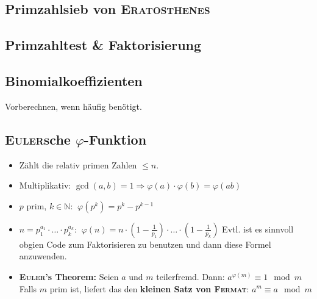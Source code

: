 \subsection{Primzahlsieb von \textsc{Eratosthenes}}


\subsection{Primzahltest \& Faktorisierung}


\subsection{Binomialkoeffizienten}
Vorberechnen, wenn häufig benötigt.


\subsection{\textsc{Euler}sche $\varphi$-Funktion}
\begin{itemize}[nosep]
	\item Zählt die relativ primen Zahlen $\leq n$.

	\item Multiplikativ:
	$\gcd(a,b) = 1 \Longrightarrow \varphi(a) \cdot \varphi(b) = \varphi(ab)$

	\item $p$ prim, $k \in \mathbb{N}$:
	$~\varphi(p^k) = p^k - p^{k - 1}$

	\item $n = p_1^{a_1} \cdot \ldots \cdot p_k^{a_k}$:
	$~\varphi(n) = n \cdot \left(1 - \frac{1}{p_1}\right) \cdot \ldots \cdot \left(1 - \frac{1}{p_k}\right)$
	Evtl. ist es sinnvoll obgien Code zum Faktorisieren zu benutzen und dann diese Formel anzuwenden.

	\item \textbf{\textsc{Euler}'s Theorem:}
	Seien $a$ und $m$ teilerfremd. Dann:
	$a^{\varphi(m)} \equiv 1 \mod m$\newline
	Falls $m$ prim ist, liefert das den \textbf{kleinen Satz von \textsc{Fermat}}:
	$a^{m} \equiv a \mod m$
\end{itemize}


